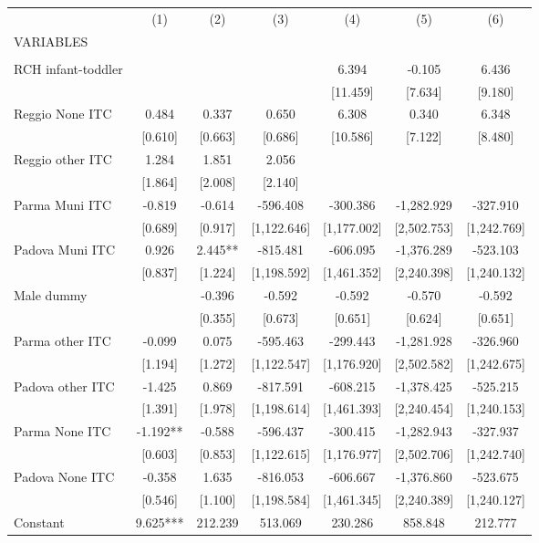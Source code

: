 \begin{tabular}{lcccccc} \hline
 & (1) & (2) & (3) & (4) & (5) & (6) \\
VARIABLES &  &  &  &  &  &  \\ \hline
 &  &  &  &  &  &  \\
RCH infant-toddler &  &  &  & 6.394 & -0.105 & 6.436 \\
 &  &  &  & [11.459] & [7.634] & [9.180] \\
Reggio None ITC & 0.484 & 0.337 & 0.650 & 6.308 & 0.340 & 6.348 \\
 & [0.610] & [0.663] & [0.686] & [10.586] & [7.122] & [8.480] \\
Reggio other ITC & 1.284 & 1.851 & 2.056 &  &  &  \\
 & [1.864] & [2.008] & [2.140] &  &  &  \\
Parma Muni ITC & -0.819 & -0.614 & -596.408 & -300.386 & -1,282.929 & -327.910 \\
 & [0.689] & [0.917] & [1,122.646] & [1,177.002] & [2,502.753] & [1,242.769] \\
Padova Muni ITC & 0.926 & 2.445** & -815.481 & -606.095 & -1,376.289 & -523.103 \\
 & [0.837] & [1.224] & [1,198.592] & [1,461.352] & [2,240.398] & [1,240.132] \\
Male dummy &  & -0.396 & -0.592 & -0.592 & -0.570 & -0.592 \\
 &  & [0.355] & [0.673] & [0.651] & [0.624] & [0.651] \\
Parma other ITC & -0.099 & 0.075 & -595.463 & -299.443 & -1,281.928 & -326.960 \\
 & [1.194] & [1.272] & [1,122.547] & [1,176.920] & [2,502.582] & [1,242.675] \\
Padova other ITC & -1.425 & 0.869 & -817.591 & -608.215 & -1,378.425 & -525.215 \\
 & [1.391] & [1.978] & [1,198.614] & [1,461.393] & [2,240.454] & [1,240.153] \\
Parma None ITC & -1.192** & -0.588 & -596.437 & -300.415 & -1,282.943 & -327.937 \\
 & [0.603] & [0.853] & [1,122.615] & [1,176.977] & [2,502.706] & [1,242.740] \\
Padova None ITC & -0.358 & 1.635 & -816.053 & -606.667 & -1,376.860 & -523.675 \\
 & [0.546] & [1.100] & [1,198.584] & [1,461.345] & [2,240.389] & [1,240.127] \\
Constant & 9.625*** & 212.239 & 513.069 & 230.286 & 858.848 & 212.777 \\

\end{tabular}
